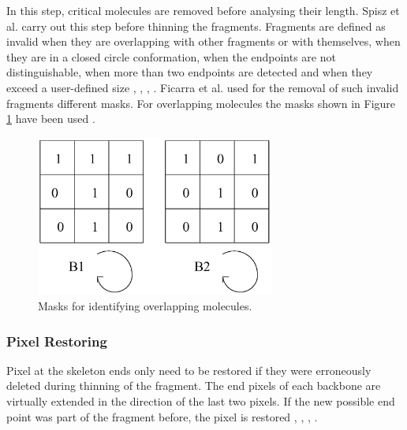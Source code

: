 \documentclass{article}
\begin{document}
In this step, critical molecules are removed before analysing their length. Spisz et al. \cite{spisz1998automated} carry out this step before thinning the fragments. Fragments are defined as invalid when they are overlapping with other fragments or with themselves, when they are in a closed circle conformation, when the endpoints are not distinguishable, when more than two endpoints are detected and when they exceed a user-defined size  \cite{spisz1998automated},  \cite{ficarra2005automated},  \cite{ficarra2002automated},  \cite{ficarra2005automatic}. Ficarra et al. used for the removal of such invalid fragments different masks. For overlapping molecules the masks shown in Figure \ref{fig: Masken} have been used  \cite{ficarra2005automated}.

\begin{figure}[htb]
\begin{center}
\includegraphics[width = 0.7\textwidth]{Masken}
\end{center}
\caption{Masks for identifying overlapping molecules. \cite{ficarra2002automated}}
\label{fig: Masken} %
\end{figure}



\subsubsection{Pixel Restoring}

Pixel at the skeleton ends only need to be restored if they were erroneously deleted during thinning of the fragment. The end pixels of each backbone are virtually extended in the direction of the last two pixels. If the new possible end point was part of the fragment before, the pixel is restored  \cite{spisz1998automated},  \cite{ficarra2005automated},  \cite{ficarra2002automated},  \cite{ficarra2005automatic}.
\end{document}

